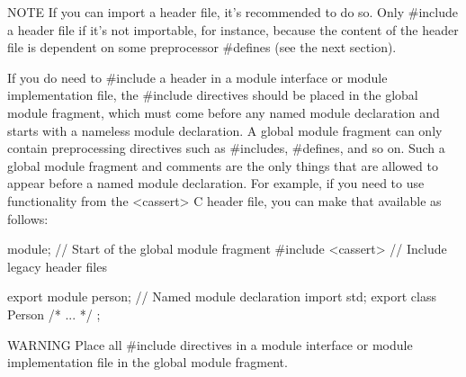 \begin{myNotic}{NOTE}
If you can import a header file, it’s recommended to do so. Only \#include a header file if it’s not importable, for instance, because the content of the header file is dependent on some preprocessor \#defines (see the next section).
\end{myNotic}

If you do need to \#include a header in a module interface or module implementation file, the \#include directives should be placed in the global module fragment, which must come before any named module declaration and starts with a nameless module declaration. A global module fragment can only contain preprocessing directives such as \#includes, \#defines, and so on. Such a global module fragment and comments are the only things that are allowed to appear before a named module declaration. For example, if you need to use functionality from the <cassert> C header file, you can make that available as follows:

\begin{cpp}
module; // Start of the global module fragment
#include <cassert> // Include legacy header files

export module person; // Named module declaration
import std;
export class Person { /* ... */ };
\end{cpp}

\begin{myWarning}{WARNING}
Place all \#include directives in a module interface or module implementation file in the global module fragment.
\end{myWarning}











